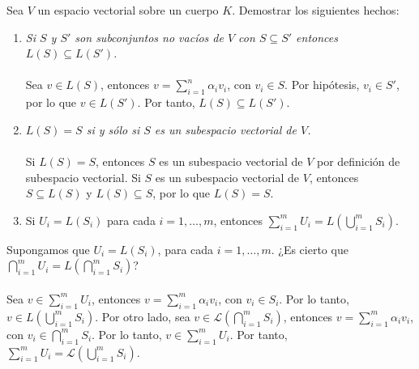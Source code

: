 \begin{ejercicio} Sea \( V \) un espacio vectorial sobre un cuerpo \( K \). Demostrar los siguientes hechos:
	\begin{enumerate}
		\item \textit{Si \( S \) y \( S' \) son subconjuntos no vacíos de \( V \) con \( S \subseteq S' \) entonces \( L(S) \subseteq L(S') \).}
		      \\ \\ Sea \( v \in L(S) \), entonces \( v = \sum_{i=1}^{n} \alpha_i v_i \), con \( v_i \in S \). Por hipótesis, \( v_i \in S' \), por lo que \( v \in L(S') \). Por tanto, \( L(S) \subseteq L(S') \).
		\item \textit{\( L(S) = S \) si y sólo si \( S \) es un subespacio vectorial de \( V \).}
		      \\ \\ Si \( L(S) = S \), entonces \( S \) es un subespacio vectorial de \( V \) por definición de subespacio vectorial. Si \( S \) es un subespacio vectorial de \( V \), entonces \( S \subseteq L(S) \) y \( L(S) \subseteq S \), por lo que \( L(S) = S \).
		\item Si \( U_i = L(S_i) \) para cada \( i = 1, \ldots, m \), entonces \( \sum_{i=1}^{m} U_i = L(\bigcup_{i=1}^{m} S_i) \).
	\end{enumerate}
	Supongamos que \( U_i = L(S_i) \), para cada \( i = 1, \ldots, m \). ¿Es cierto que \( \bigcap_{i=1}^{m} U_i = L(\bigcap_{i=1}^{m} S_i) \)?
	\\ \\ Sea \( v \in \sum_{i=1}^{m} U_i \), entonces \( v = \sum_{i=1}^{m} \alpha_i v_i \), con \( v_i \in S_i \). Por lo tanto, \( v \in L(\bigcup_{i=1}^{m} S_i) \). Por otro lado, sea \( v \in \mathcal{L}(\bigcap_{i=1}^{m} S_i) \), entonces \( v = \sum_{i=1}^{m} \alpha_i v_i \), con \( v_i \in \bigcap_{i=1}^{m} S_i \). Por lo tanto, \( v \in \sum_{i=1}^{m} U_i \). Por tanto, \( \sum_{i=1}^{m} U_i = \mathcal{L}(\bigcup_{i=1}^{m} S_i) \).

\end{ejercicio}



